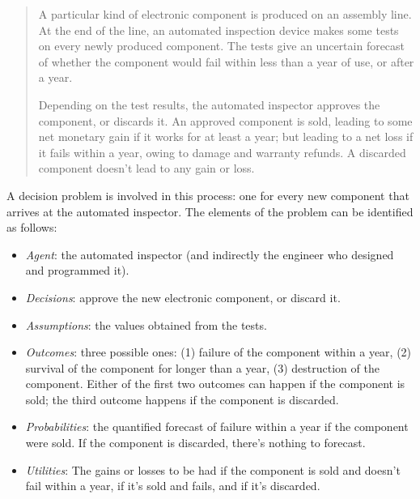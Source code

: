 \documentclass[
  a4paper,
  DIV=11,
  numbers=noendperiod,
  oneside]{scrreprt}
\providecommand{\tightlist}{%
  \setlength{\itemsep}{0pt}\setlength{\parskip}{0pt}}\usepackage{longtable,booktabs,array}
\begin{document}
\begin{tcolorbox}[enhanced jigsaw, arc=.35mm, colback=white, bottomrule=.15mm, bottomtitle=1mm, breakable, opacityback=0, toptitle=1mm, toprule=.15mm, rightrule=.15mm, colframe=quarto-callout-note-color-frame, leftrule=.75mm, left=2mm, opacitybacktitle=0.6, titlerule=0mm, colbacktitle=quarto-callout-note-color!10!white, title={Example}, coltitle=black]

\begin{quote}
A particular kind of electronic component is produced on an assembly
line. At the end of the line, an automated inspection device makes some
tests on every newly produced component. The tests give an uncertain
forecast of whether the component would fail within less than a year of
use, or after a year.

Depending on the test results, the automated inspector approves the
component, or discards it. An approved component is sold, leading to
some net monetary gain if it works for at least a year; but leading to a
net loss if it fails within a year, owing to damage and warranty
refunds. A discarded component doesn't lead to any gain or loss.\\
\end{quote}

A decision problem is involved in this process: one for every new
component that arrives at the automated inspector. The elements of the
problem can be identified as follows:

\begin{itemize}
\tightlist
\item
  \emph{Agent}: the automated inspector (and indirectly the engineer who
  designed and programmed it).
\item
  \emph{Decisions}: approve the new electronic component, or discard it.
\item
  \emph{Assumptions}: the values obtained from the tests.
\item
  \emph{Outcomes}: three possible ones: (1) failure of the component
  within a year, (2) survival of the component for longer than a year,
  (3) destruction of the component. Either of the first two outcomes can
  happen if the component is sold; the third outcome happens if the
  component is discarded.
\item
  \emph{Probabilities}: the quantified forecast of failure within a year
  if the component were sold. If the component is discarded, there's
  nothing to forecast.
\item
  \emph{Utilities}: The gains or losses to be had if the component is
  sold and doesn't fail within a year, if it's sold and fails, and if
  it's discarded.
\end{itemize}

\end{tcolorbox}
\end{document}

